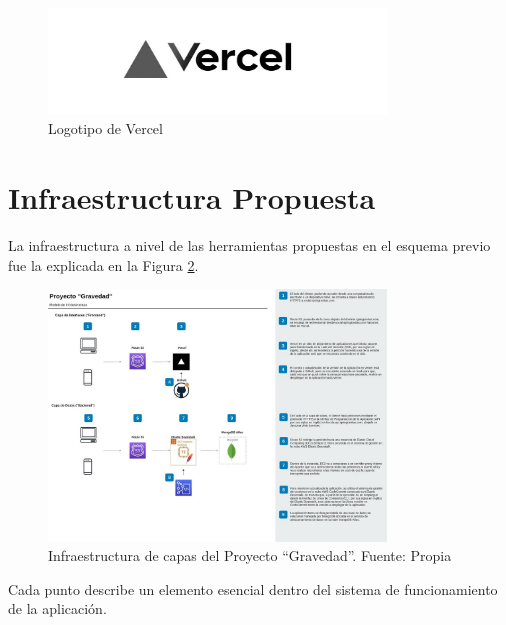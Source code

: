 \begin{figure}[H]
\centering
\includegraphics[width=0.80\textwidth]{img/12.png}
\caption{Logotipo de Vercel}
\label{figure:VercelLogo}
\end{figure}


\section{Infraestructura Propuesta}

La infraestructura a nivel de las herramientas propuestas en el esquema previo fue la explicada en la Figura \ref{figure:infraDiagram}.

\begin{figure}[H]
\centering
\includegraphics[width=0.80\textwidth]{img/13.jpg}
\caption{Infraestructura de capas del Proyecto “Gravedad”.
Fuente: Propia}
\label{figure:infraDiagram}
\end{figure}

Cada punto describe un elemento esencial dentro del sistema de funcionamiento de la aplicación.

